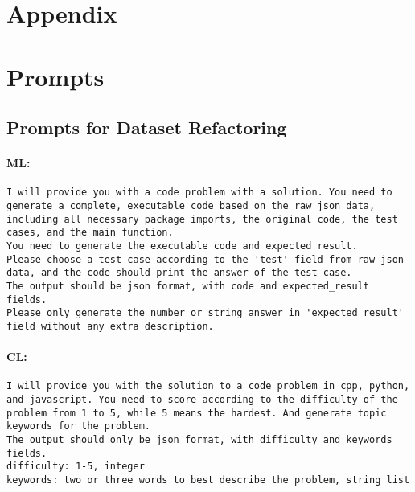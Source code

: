 \newpage
\section*{Appendix}
\appendix
\label{sec:appendix}

\section{Prompts}

\subsection{Prompts for Dataset Refactoring}


\paragraph{ML:}

\begin{tcolorbox}[left=0mm,right=0mm,top=0mm,bottom=0mm,boxsep=1mm,arc=0mm,boxrule=0pt, frame empty, breakable]
    \small
    \begin{lstlisting}
I will provide you with a code problem with a solution. You need to generate a complete, executable code based on the raw json data, including all necessary package imports, the original code, the test cases, and the main function. 
You need to generate the executable code and expected result.
Please choose a test case according to the 'test' field from raw json data, and the code should print the answer of the test case.
The output should be json format, with code and expected_result fields.
Please only generate the number or string answer in 'expected_result' field without any extra description.
\end{lstlisting}
\end{tcolorbox}

\paragraph{CL:}

\begin{tcolorbox}[left=0mm,right=0mm,top=0mm,bottom=0mm,boxsep=1mm,arc=0mm,boxrule=0pt, frame empty, breakable]
    \small
    \begin{lstlisting}
I will provide you with the solution to a code problem in cpp, python, and javascript. You need to score according to the difficulty of the problem from 1 to 5, while 5 means the hardest. And generate topic keywords for the problem.
The output should only be json format, with difficulty and keywords fields.
difficulty: 1-5, integer
keywords: two or three words to best describe the problem, string list
\end{lstlisting}
\end{tcolorbox}


